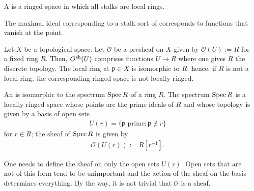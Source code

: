 \documentclass [11 pt, oneside] {article}
\begin{document}
\begin{definition}[ ]\label{}\text{}
A  is a ringed space in which all stalks are local rings.
\end{definition}

\begin{remark}
	The maximal ideal corresponding to a stalk sort of corresponds to functions that vanish at the point.
\end{remark}

\begin{example}\label{}\text{}
Let $X$ be a topological space. Let $\mathscr{O}$ be a presheaf on $X$ given by $\mathscr{O}(U) := R$ for a fixed ring $R$. Then, $\relax{O}^{\textup {sh}}(U)$ comprises functions $U\longrightarrow R$ where one gives $R$ the discrete topology. The local ring at $\mathfrak{p}\in X$ is isomorphic to $R$; hence, if $R$ is not a local ring, the corresponding ringed space is not locally ringed. 
\end{example}

\begin{definition}[ ]\label{}\text{}
An  is isomorphic to the spectrum $\operatorname{Spec} R$ of a ring $R$. The spectrum $\operatorname{Spec} R$ is a locally ringed space whose points are the prime ideals of $R$ and whose topology is given by a basis of open sets
\begin{align*}
	U(r) = \{\mathfrak{p} \textrm{ prime}: \mathfrak{p}\not\ni r\}
\end{align*}
for $r\in R$; the sheaf of $\operatorname{Spec} R$ is given by
\begin{align*}
	\mathscr{O}(U(r)) := R[r ^{-1}].
\end{align*}
\end{definition}

\begin{remark}
	One needs to define the sheaf on only the open sets $U(r)$. Open sets that are not of this form tend to be unimportant and the action of the sheaf on the basis determines everything. By the way, it is not trivial that $\mathscr{O}$ is a sheaf.
\end{remark}
\end{document}
